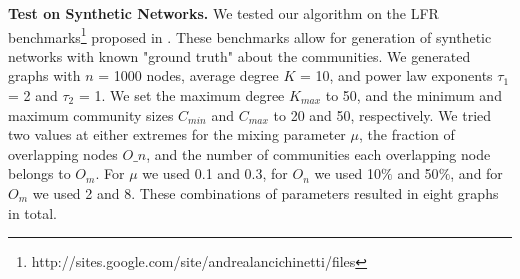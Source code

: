 




{\bf Test on Synthetic Networks. } We tested our algorithm on the LFR benchmarks\footnote{http://sites.google.com/site/andrealancichinetti/files} proposed in \cite{2008PhRvE..78d6110L}. These benchmarks allow
for generation of synthetic networks with known "ground truth"  about the communities.
We generated graphs with $n$ = 1000 nodes, average degree $K$ = 10, and power law exponents $\tau_1$ = 2 and $\tau_2$ = 1. We set the maximum degree $K_{max}$ to 50, and the minimum and maximum community sizes $C_{min}$ and $C_{max}$ to 20 and 50, respectively. We tried two values at either extremes for the mixing parameter $\mu$, the fraction of overlapping nodes $O\_n$, and the number of communities each overlapping node belongs to $O_m$. For $\mu$ we used 0.1 and 0.3, for $O_n$ we used 10$\%$ and 50$\%$, and for $O_m$ we used 2 and 8. These combinations of parameters resulted in 
eight graphs in total.

